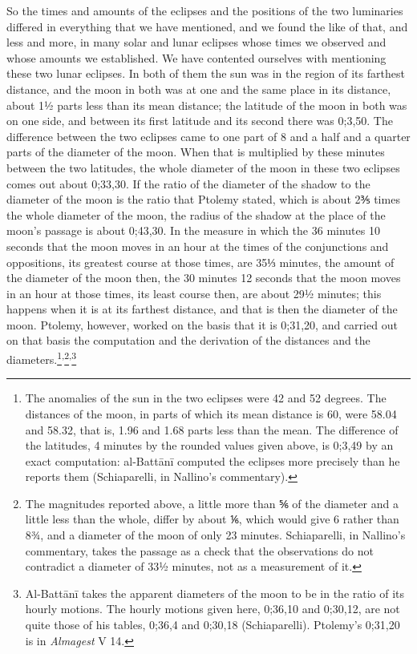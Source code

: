 \documentclass[11pt]{article}
\begin{document}
\par So the times and amounts of the eclipses and the positions of the two luminaries differed in everything that we have mentioned, and we found the like of that, and less and more, in many solar and lunar eclipses whose times we observed and whose amounts we established. We have contented ourselves with mentioning these two lunar eclipses. In both of them the sun was in the region of its farthest distance, and the moon in both was at one and the same place in its distance, about 1½ parts less than its mean distance; the latitude of the moon in both was on one side, and between its first latitude and its second there was 0;3,50. The difference between the two eclipses came to one part of 8 and a half and a quarter parts of the diameter of the moon. When that is multiplied by these minutes between the two latitudes, the whole diameter of the moon in these two eclipses comes out about 0;33,30. If the ratio of the diameter of the shadow to the diameter of the moon is the ratio that Ptolemy stated, which is about 2⅗ times the whole diameter of the moon, the radius of the shadow at the place of the moon's passage is about 0;43,30. In the measure in which the 36 minutes 10 seconds that the moon moves in an hour at the times of the conjunctions and oppositions, its greatest course at those times, are 35⅓ minutes, the amount of the diameter of the moon then, the 30 minutes 12 seconds that the moon moves in an hour at those times, its least course then, are about 29½ minutes; this happens when it is at its farthest distance, and that is then the diameter of the moon. Ptolemy, however, worked on the basis that it is 0;31,20, and carried out on that basis the computation and the derivation of the distances and the diameters.\footnote{The anomalies of the sun in the two eclipses were 42 and 52 degrees. The distances of the moon, in parts of which its mean distance is 60, were 58.04 and 58.32, that is, 1.96 and 1.68 parts less than the mean. The difference of the latitudes, 4 minutes by the rounded values given above, is 0;3,49 by an exact computation: al-Battānī computed the eclipses more precisely than he reports them (Schiaparelli, in Nallino's commentary).}\textsuperscript{,}\footnote{The magnitudes reported above, a little more than ⅚ of the diameter and a little less than the whole, differ by about ⅙, which would give 6 rather than 8¾, and a diameter of the moon of only 23 minutes. Schiaparelli, in Nallino's commentary, takes the passage as a check that the observations do not contradict a diameter of 33½ minutes, not as a measurement of it.}\textsuperscript{,}\footnote{Al-Battānī takes the apparent diameters of the moon to be in the ratio of its hourly motions. The hourly motions given here, 0;36,10 and 0;30,12, are not quite those of his tables, 0;36,4 and 0;30,18 (Schiaparelli). Ptolemy's 0;31,20 is in \emph{Almagest} V 14.}\par
\end{document}
